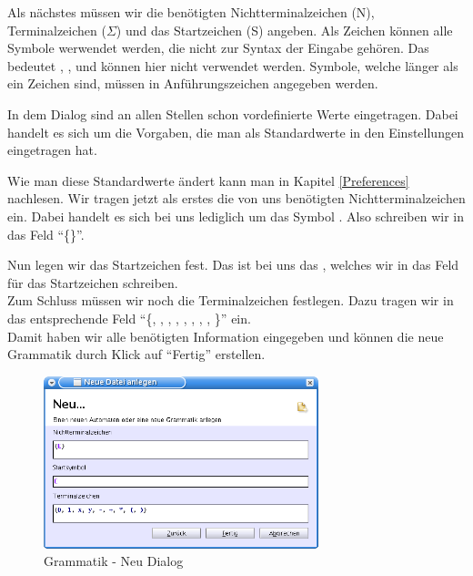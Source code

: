 Als nächstes müssen wir die benötigten Nichtterminalzeichen (N),
Terminalzeichen ($\Sigma$) und das Startzeichen (S) angeben.  Als Zeichen
können alle Symbole werwendet werden, die nicht zur Syntax der Eingabe gehören.
Das bedeutet \Symbol{,}, \Symbol{\{}, \Symbol{\}} und \SymbolEmpty{}
können hier nicht verwendet werden. Symbole, welche länger als ein Zeichen sind,
müssen in Anführungszeichen angegeben werden.\vspace{10pt}

In dem Dialog sind an allen Stellen schon vordefinierte Werte eingetragen.
Dabei handelt es sich um die Vorgaben, die man als Standardwerte in den
Einstellungen eingetragen hat.

Wie man diese Standardwerte ändert kann man in Kapitel \ref{Preferences}
nachlesen. Wir tragen jetzt als erstes die von uns benötigten
Nichtterminalzeichen ein. Dabei handelt es sich bei uns lediglich um das Symbol
. Also schreiben wir in das Feld
"`\{\}"'.\vspace{10pt}

Nun legen wir das Startzeichen fest. Das ist bei uns das ,
welches wir in das Feld für das Startzeichen schreiben.\\
Zum Schluss müssen wir noch die Terminalzeichen festlegen. Dazu tragen
wir in das entsprechende Feld "`\{, ,
, , \TerminalSymbol{-}, \TerminalSymbol{+},
\TerminalSymbol{*}, \TerminalSymbol{(}, \TerminalSymbol{)}\}"' ein.\\ Damit
haben wir alle benötigten Information eingegeben und können die neue Grammatik
durch Klick auf "`Fertig"' erstellen.\vspace{10pt}

\begin{figure}[h]
\begin{center}
\includegraphics[width=8cm]{../images/new_dialog_grammar.png}
\caption{Grammatik - Neu Dialog}
\end{center}
\end{figure}

